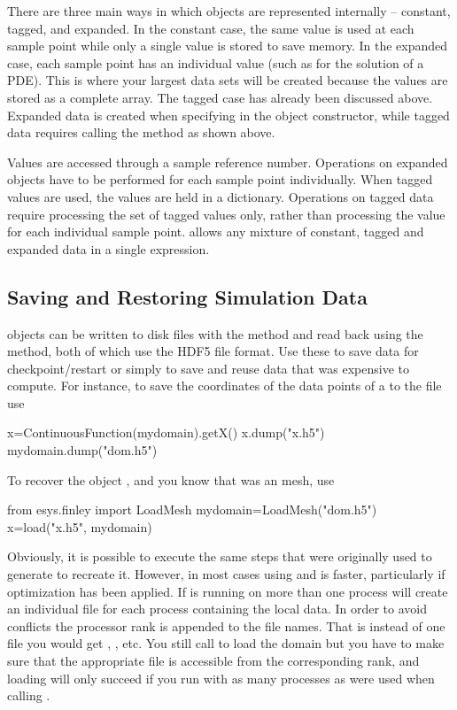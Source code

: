 There are three main ways in which \Data objects are represented internally --
constant, tagged, and expanded.
In the constant case, the same value is used at each sample point while only a
single value is stored to save memory.
In the expanded case, each sample point has an individual value (such as for the solution of a PDE).
This is where your largest data sets will be created because the values are
stored as a complete array.
The tagged case has already been discussed above.
Expanded data is created when specifying  in the \Data
object constructor, while tagged data requires calling the 
method as shown above.

Values are accessed through a sample reference number.
Operations on expanded \Data objects have to be performed for each sample
point individually.
When tagged values are used, the values are held in a dictionary.
Operations on tagged data require processing the set of tagged values only,
rather than processing the value for each individual sample point.
\escript allows any mixture of constant, tagged and expanded data in a single expression.

\subsection{Saving and Restoring Simulation Data}
\Data objects can be written to disk files with the  method and
read back using the  method, both of which use the
HDF5\cite{HDF5} file format.
Use these to save data for checkpoint/restart or simply to save and reuse data
that was expensive to compute.
For instance, to save the coordinates of the data points of a
\ContinuousFunction to the file  use
\begin{python}
  x=ContinuousFunction(mydomain).getX()
  x.dump("x.h5")
  mydomain.dump("dom.h5")
\end{python}
To recover the object , and you know that  was an \finley
mesh, use
\begin{python}
  from esys.finley import LoadMesh
  mydomain=LoadMesh("dom.h5")
  x=load("x.h5", mydomain)
\end{python}
Obviously, it is possible to execute the same steps that were originally used
to generate  to recreate it. However, in most cases using
 and  is faster, particularly if optimization has
been applied.
If \escript is running on more than one \MPI process  will create
an individual file for each process containing the local data.
In order to avoid conflicts the \MPI processor
rank is appended to the file names.
That is instead of one file  you would get
, , etc.
You still call  to load the domain but you have to
make sure that the appropriate file is accessible from the corresponding rank,
and loading will only succeed if you run with as many processes as were used
when calling .

